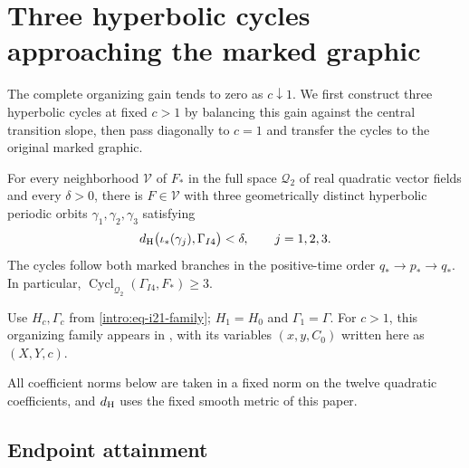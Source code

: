 \section{Three hyperbolic cycles approaching the marked graphic}
\label{sharp:lower-section}

The complete organizing gain tends to zero as \(c\downarrow1\).
We first construct three hyperbolic cycles at fixed \(c>1\) by
balancing this gain against the central transition slope, then pass
diagonally to \(c=1\) and transfer the cycles to the original marked
graphic.

\begin{theorem}\label{sharp:lower-theorem}
For every neighborhood \(\mathcal V\) of \(F_*\) in the full space
\(\mathcal Q_2\) of real quadratic vector fields and every
\(\delta>0\), there is \(F\in\mathcal V\) with three geometrically
distinct hyperbolic periodic orbits \(\gamma_1,\gamma_2,\gamma_3\)
satisfying
\[
 d_{\rm H}\bigl(\iota_*(\gamma_j),\Gamma_{I4}\bigr)<\delta,
 \qquad j=1,2,3.
\]
The cycles follow both marked branches in the positive-time order
\(q_*\to p_*\to q_*\). In particular,
\(\operatorname{Cycl}_{\mathcal Q_2}(\Gamma_{I4},F_*)\ge3\).
\end{theorem}

Use \(H_c,\Gamma_c\) from \eqref{intro:eq-i21-family};
\(H_1=H_0\) and \(\Gamma_1=\Gamma\).
For \(c>1\), this organizing family appears in
\cite[(1.1)--(1.3), p.~2]{Lu26I21}, with its variables \((x,y,C_0)\)
written here as \((X,Y,c)\).

All coefficient norms below are taken in a fixed norm on the twelve
quadratic coefficients, and \(d_{\rm H}\) uses the fixed smooth metric
of this paper.



\subsection{Endpoint attainment}

